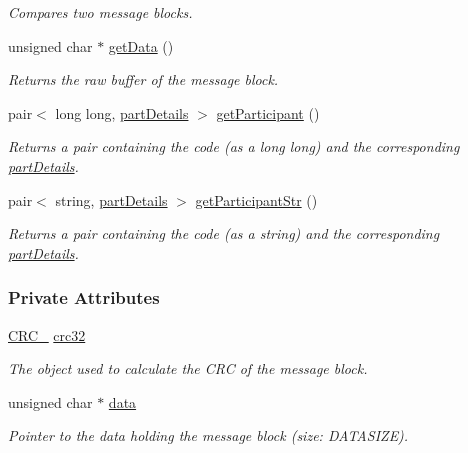 \begin{CompactItemize}
\begin{CompactList}\small\item\em Compares two message blocks.\item\end{CompactList}\item 
unsigned char $\ast$ \hyperlink{classconnectionMsgBlock_connectionMsgBlocka6}{get\-Data} ()
\begin{CompactList}\small\item\em Returns the raw buffer of the message block.\item\end{CompactList}\item 
pair$<$ long long, \hyperlink{classpartDetails}{part\-Details} $>$ \hyperlink{classconnectionMsgBlock_connectionMsgBlocka7}{get\-Participant} ()
\begin{CompactList}\small\item\em Returns a pair containing the code (as a long long) and the corresponding \hyperlink{classpartDetails}{part\-Details}.\item\end{CompactList}\item 
pair$<$ string, \hyperlink{classpartDetails}{part\-Details} $>$ \hyperlink{classconnectionMsgBlock_connectionMsgBlocka8}{get\-Participant\-Str} ()
\begin{CompactList}\small\item\em Returns a pair containing the code (as a string) and the corresponding \hyperlink{classpartDetails}{part\-Details}.\item\end{CompactList}\end{CompactItemize}
\subsubsection*{Private Attributes}
\begin{CompactItemize}
\item 
\hyperlink{classCRC__32}{CRC\_} \hyperlink{classconnectionMsgBlock_connectionMsgBlocko0}{crc32}
\begin{CompactList}\small\item\em The object used to calculate the CRC of the message block.\item\end{CompactList}\item 
unsigned char $\ast$ \hyperlink{classconnectionMsgBlock_connectionMsgBlocko1}{data}
\begin{CompactList}\small\item\em Pointer to the data holding the message block (size: DATASIZE).\item\end{CompactList}\end{CompactItemize}


